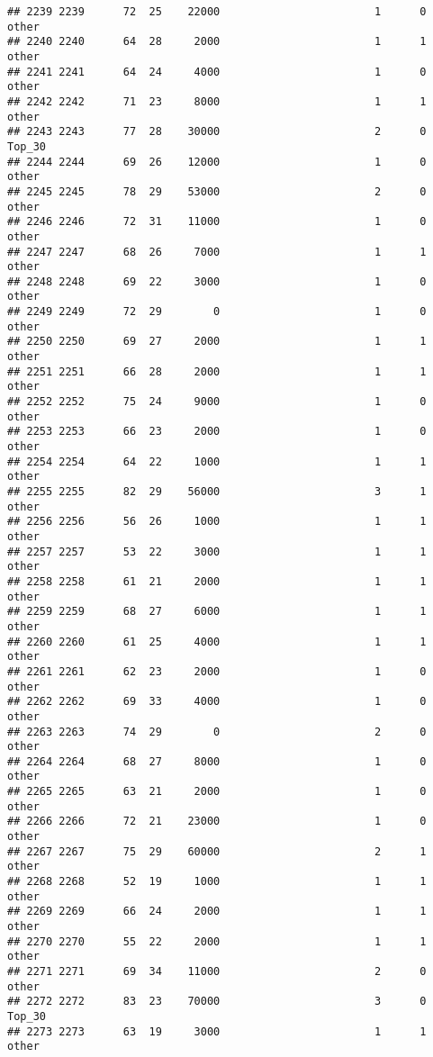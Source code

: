 \documentclass[
]{article}
\begin{document}
\begin{verbatim}
## 2239 2239      72  25    22000                        1      0    other
## 2240 2240      64  28     2000                        1      1    other
## 2241 2241      64  24     4000                        1      0    other
## 2242 2242      71  23     8000                        1      1    other
## 2243 2243      77  28    30000                        2      0   Top_30
## 2244 2244      69  26    12000                        1      0    other
## 2245 2245      78  29    53000                        2      0    other
## 2246 2246      72  31    11000                        1      0    other
## 2247 2247      68  26     7000                        1      1    other
## 2248 2248      69  22     3000                        1      0    other
## 2249 2249      72  29        0                        1      0    other
## 2250 2250      69  27     2000                        1      1    other
## 2251 2251      66  28     2000                        1      1    other
## 2252 2252      75  24     9000                        1      0    other
## 2253 2253      66  23     2000                        1      0    other
## 2254 2254      64  22     1000                        1      1    other
## 2255 2255      82  29    56000                        3      1    other
## 2256 2256      56  26     1000                        1      1    other
## 2257 2257      53  22     3000                        1      1    other
## 2258 2258      61  21     2000                        1      1    other
## 2259 2259      68  27     6000                        1      1    other
## 2260 2260      61  25     4000                        1      1    other
## 2261 2261      62  23     2000                        1      0    other
## 2262 2262      69  33     4000                        1      0    other
## 2263 2263      74  29        0                        2      0    other
## 2264 2264      68  27     8000                        1      0    other
## 2265 2265      63  21     2000                        1      0    other
## 2266 2266      72  21    23000                        1      0    other
## 2267 2267      75  29    60000                        2      1    other
## 2268 2268      52  19     1000                        1      1    other
## 2269 2269      66  24     2000                        1      1    other
## 2270 2270      55  22     2000                        1      1    other
## 2271 2271      69  34    11000                        2      0    other
## 2272 2272      83  23    70000                        3      0   Top_30
## 2273 2273      63  19     3000                        1      1    other

\end{verbatim}
\end{document}
